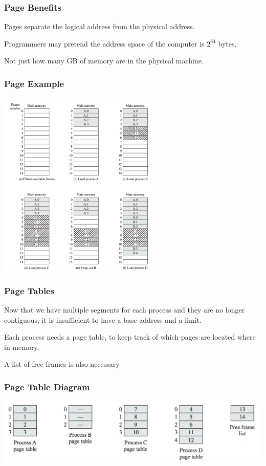 \begin{frame}
\frametitle{Page Benefits}

Pages separate the logical address from the physical address.

Programmers may pretend the address space of the computer is $2^{64}$ bytes.

Not just how many GB of memory are in the physical machine. 

\end{frame}

\begin{frame}
\frametitle{Page Example}

\begin{center}
\includegraphics[width=0.6\textwidth]{images/loading-pages.png}
\end{center}


\end{frame}

\begin{frame}
\frametitle{Page Tables}

Now that we have multiple segments for each process and they are no longer contiguous, it is insufficient to have a base address and a limit.

Each process needs a page table, to keep track of which pages are located where in memory. 

A list of free frames is also necessary

\end{frame}

\begin{frame}
\frametitle{Page Table Diagram}

\begin{center}
\includegraphics[width=\textwidth]{images/page-tables.png}
\end{center}


\end{frame}

